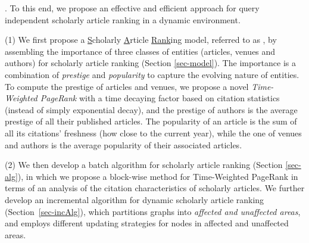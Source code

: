 
.
To this end, we propose an effective and efficient approach for query independent scholarly article ranking in a dynamic environment.

\sstab(1) We first  propose a \underline{S}cholarly \underline{A}rticle \underline{Rank}ing model, referred to as \ensemblerank, by assembling the importance of three classes of entities (articles, venues and authors) for scholarly article ranking (Section \ref{sec-model}).
%
The importance is a combination of {\em prestige} and {\em popularity} to capture the evolving nature of entities.
%
To compute the prestige of articles and venues, we propose a novel {\em Time-Weighted PageRank} with a time decaying factor based on citation statistics (instead of simply exponential decay), and the prestige of authors is the average prestige of all their published articles.
%
The popularity of an article is the sum of all its citations' freshness (how close to the current year), while the one of venues and authors is the average popularity of their associated articles.
%
%


\sstab(2)  We then develop  a batch algorithm for scholarly article ranking (Section \ref{sec-alg}), in which we propose a block-wise method for Time-Weighted PageRank in terms of an analysis of the citation characteristics of scholarly articles.
%
We further develop an incremental algorithm for dynamic scholarly article ranking (Section~\ref{sec-incAlg}), which partitions graphs into  {\em affected and unaffected areas}, and employs different updating strategies for nodes in affected and unaffected areas.


